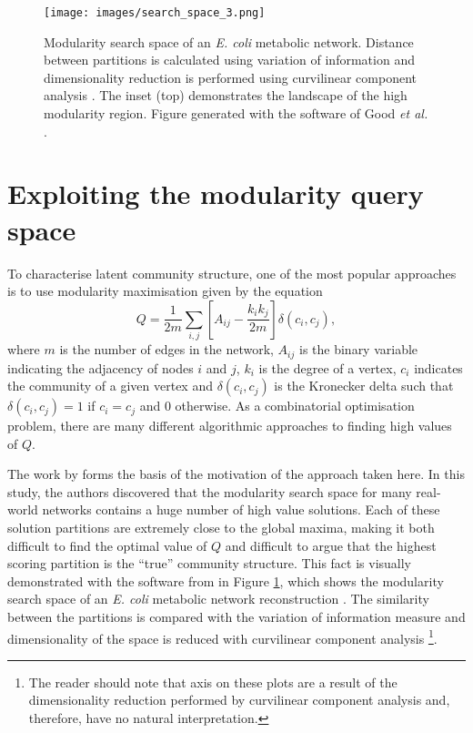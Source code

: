 \documentclass[sigconf]{acmart}
\begin{document}
\begin{figure}[t]
    \texttt{[image: images/search\_space\_3.png]}
    \caption{Modularity search space of an \textit{E. coli} metabolic network.
 Distance between partitions is calculated using variation of information \cite{meilua2003comparing} and dimensionality reduction is performed using curvilinear component analysis \cite{demartines1997curvilinear}.
  The inset (top) demonstrates the landscape of the high modularity region.
  Figure generated with the software of Good \textit{et al.} \cite{good2010performance}.}
    \label{fig:modular_search_space}
\end{figure}

\section{Exploiting the modularity query space}
To characterise latent community structure, one of the most popular approaches is to use modularity maximisation given by the equation \cite{newman2004}
\begin{equation}\label{eq:modularity}
  Q = \frac{1}{2m}\sum_{i,j} \left[A_{ij} - \frac{k_i k_j}{2m}\right]\delta(c_i, c_j),
\end{equation}
where $m$ is the number of edges in the network, $A_{ij}$ is the binary variable indicating the adjacency of nodes $i$ and $j$, $k_i$ is the degree of a vertex, $c_i$ indicates the community of a given vertex and $\delta(c_i, c_j)$ is the Kronecker delta such that $\delta(c_i, c_j) = 1$ if $c_i = c_j$ and $0$ otherwise.
As a combinatorial optimisation problem, there are many different algorithmic approaches to finding high values of $Q$.

The work by \cite{good2010performance} forms the basis of the motivation of the approach taken here.
In this study, the authors discovered that the modularity search space for many real-world networks contains a huge number of high value solutions.
Each of these solution partitions are extremely close to the global maxima, making it both difficult to find the optimal value of $Q$ and difficult to argue that the highest scoring partition is the ``true'' community structure.
This fact is visually demonstrated with the software from \cite{good2010performance} in Figure \ref{fig:modular_search_space}, which shows the modularity search space of an \textit{E. coli} metabolic network reconstruction \cite{GuimeraNature2005}.
The similarity between the partitions is compared with the variation of information measure \cite{meilua2003comparing} and dimensionality of the space is reduced with curvilinear component analysis \cite{demartines1997curvilinear} \footnote{The reader should note that axis on these plots are a result of the dimensionality reduction performed by curvilinear component analysis \cite{demartines1997curvilinear} and, therefore, have no natural interpretation.}.
\end{document}
